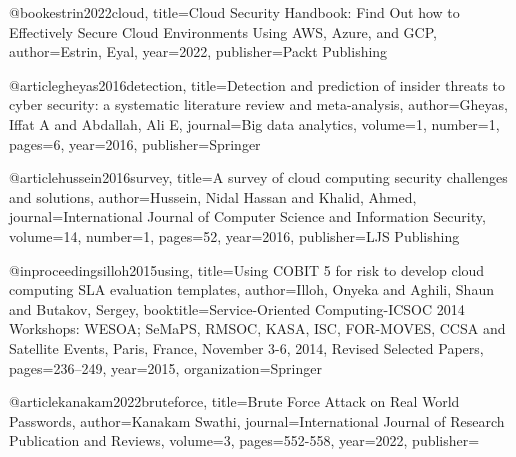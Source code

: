 @book{estrin2022cloud,
  title={Cloud Security Handbook: Find Out how to Effectively Secure Cloud Environments Using AWS, Azure, and GCP},
  author={Estrin, Eyal},
  year={2022},
  publisher={Packt Publishing}
}










@article{gheyas2016detection,
  title={Detection and prediction of insider threats to cyber security: a systematic literature review and meta-analysis},
  author={Gheyas, Iffat A and Abdallah, Ali E},
  journal={Big data analytics},
  volume={1},
  number={1},
  pages={6},
  year={2016},
  publisher={Springer}
}











@article{hussein2016survey,
  title={A survey of cloud computing security challenges and solutions},
  author={Hussein, Nidal Hassan and Khalid, Ahmed},
  journal={International Journal of Computer Science and Information Security},
  volume={14},
  number={1},
  pages={52},
  year={2016},
  publisher={LJS Publishing}
}














@inproceedings{illoh2015using,
  title={Using COBIT 5 for risk to develop cloud computing SLA evaluation templates},
  author={Illoh, Onyeka and Aghili, Shaun and Butakov, Sergey},
  booktitle={Service-Oriented Computing-ICSOC 2014 Workshops: WESOA; SeMaPS, RMSOC, KASA, ISC, FOR-MOVES, CCSA and Satellite Events, Paris, France, November 3-6, 2014, Revised Selected Papers},
  pages={236--249},
  year={2015},
  organization={Springer}
}












@article{kanakam2022bruteforce,
  title={Brute Force Attack on Real World Passwords},
  author={Kanakam Swathi},
  journal={International Journal of Research Publication and Reviews},
  volume={3},
  pages={552-558},
  year={2022},
  publisher={}
}












